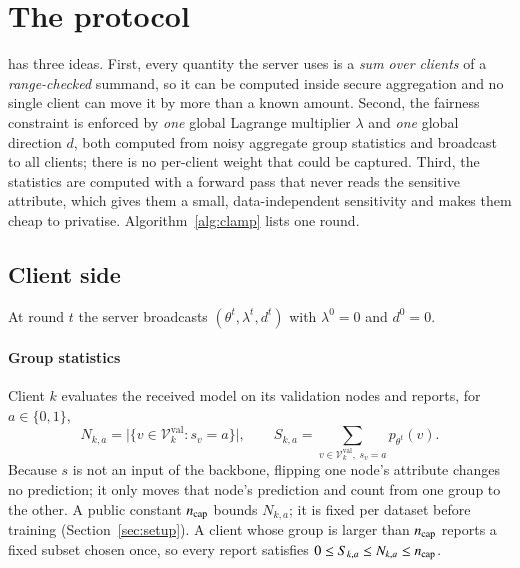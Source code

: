 \section{The \clamp{} protocol}\label{sec:method}

\clamp{} has three ideas. First, every quantity the server uses is a \emph{sum over clients} of a \emph{range-checked} summand, so it can be computed inside secure aggregation and no single client can move it by more than a known amount. Second, the fairness constraint is enforced by \emph{one} global Lagrange multiplier $\lambda$ and \emph{one} global direction $d$, both computed from noisy aggregate group statistics and broadcast to all clients; there is no per-client weight that could be captured. Third, the statistics are computed with a forward pass that never reads the sensitive attribute, which gives them a small, data-independent sensitivity and makes them cheap to privatise. Algorithm~\ref{alg:clamp} lists one round.

\subsection{Client side}
At round $t$ the server broadcasts $(\theta^t,\lambda^t,d^t)$ with $\lambda^0=0$ and $d^0=0$.

\paragraph{Group statistics}
Client $k$ evaluates the received model on its validation nodes and reports, for $a\in\{0,1\}$,
\begin{equation}\label{eq:stats}
N_{k,a}=\bigl|\{v\in\mathcal{V}^{\mathrm{val}}_k:s_v=a\}\bigr|,\qquad S_{k,a}=\sum_{v\in\mathcal{V}^{\mathrm{val}}_k,\;s_v=a}p_{\theta^t}(v).
\end{equation}
Because $s$ is not an input of the backbone, flipping one node's attribute changes no prediction; it only moves that node's prediction and count from one group to the other. A public constant $n_{\mathrm{cap}}$ bounds $N_{k,a}$; it is fixed per dataset before training (Section~\ref{sec:setup}). A client whose group is larger than $n_{\mathrm{cap}}$ reports a fixed subset chosen once, so every report satisfies $0\le S_{k,a}\le N_{k,a}\le n_{\mathrm{cap}}$.

